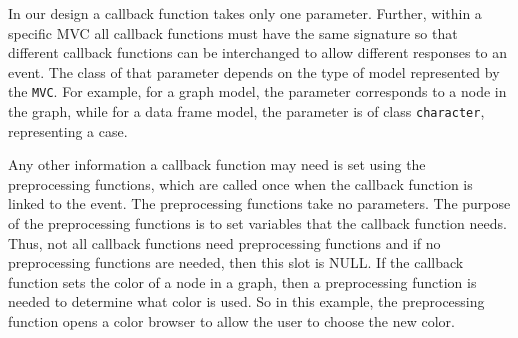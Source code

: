 \documentclass{article}[11pt]
\newcommand{\Robject}[1]{{\texttt{#1}}}
\newcommand{\Rclass}[1]{\texttt{#1}}
\begin{document}
In our design a callback function takes only one parameter. Further,
within a specific MVC all callback functions must have the same
signature so that different callback functions can be interchanged to
allow different responses to an event.  The class of that parameter
depends on the type of model represented by the \Robject{MVC}.  For
example, for a graph model, the parameter corresponds to a node in the
graph, while for a data frame model, the parameter is of class
\Rclass{character}, representing a case.

Any other information a callback function may need is set using the
preprocessing functions, which are called once when the callback function is
linked to the event.  The preprocessing functions take no
parameters.  The purpose of the preprocessing functions is to set
variables that the callback function needs.  Thus, not all callback
functions need preprocessing functions and if no preprocessing
functions are needed, then this slot is NULL.  If the callback
function sets the color of a node in a graph, then a preprocessing
function is needed to determine what color is used.  So in this
example, the preprocessing function opens a color browser to allow the
user to choose the new color.
\end{document}
